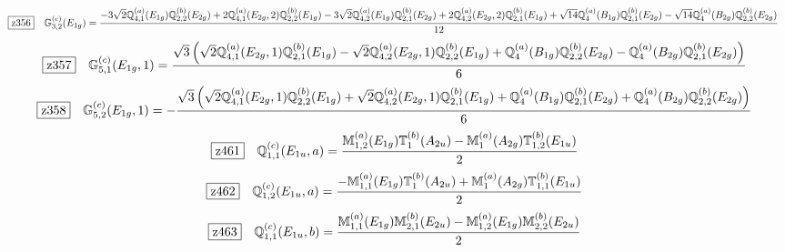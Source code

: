 \documentclass[fleqn,10pt,landscape]{jsarticle}
\begin{document}
\begin{dmath*}
\hspace*{3mm}\fbox{z356}\quad \mathbb{G}_{3,2}^{(c)}(E_{1g})=\frac{- 3 \sqrt{2} \mathbb{Q}_{4,1}^{(a)}(E_{1g}) \mathbb{Q}_{2,2}^{(b)}(E_{2g}) + 2 \mathbb{Q}_{4,1}^{(a)}(E_{2g},2) \mathbb{Q}_{2,2}^{(b)}(E_{1g}) - 3 \sqrt{2} \mathbb{Q}_{4,2}^{(a)}(E_{1g}) \mathbb{Q}_{2,1}^{(b)}(E_{2g}) + 2 \mathbb{Q}_{4,2}^{(a)}(E_{2g},2) \mathbb{Q}_{2,1}^{(b)}(E_{1g}) + \sqrt{14} \mathbb{Q}_{4}^{(a)}(B_{1g}) \mathbb{Q}_{2,1}^{(b)}(E_{2g}) - \sqrt{14} \mathbb{Q}_{4}^{(a)}(B_{2g}) \mathbb{Q}_{2,2}^{(b)}(E_{2g})}{12}
\end{dmath*}
\begin{dmath*}
\hspace*{3mm}\fbox{z357}\quad \mathbb{G}_{5,1}^{(c)}(E_{1g},1)=\frac{\sqrt{3} \left(\sqrt{2} \mathbb{Q}_{4,1}^{(a)}(E_{2g},1) \mathbb{Q}_{2,1}^{(b)}(E_{1g}) - \sqrt{2} \mathbb{Q}_{4,2}^{(a)}(E_{2g},1) \mathbb{Q}_{2,2}^{(b)}(E_{1g}) + \mathbb{Q}_{4}^{(a)}(B_{1g}) \mathbb{Q}_{2,2}^{(b)}(E_{2g}) - \mathbb{Q}_{4}^{(a)}(B_{2g}) \mathbb{Q}_{2,1}^{(b)}(E_{2g})\right)}{6}
\end{dmath*}
\begin{dmath*}
\hspace*{3mm}\fbox{z358}\quad \mathbb{G}_{5,2}^{(c)}(E_{1g},1)=- \frac{\sqrt{3} \left(\sqrt{2} \mathbb{Q}_{4,1}^{(a)}(E_{2g},1) \mathbb{Q}_{2,2}^{(b)}(E_{1g}) + \sqrt{2} \mathbb{Q}_{4,2}^{(a)}(E_{2g},1) \mathbb{Q}_{2,1}^{(b)}(E_{1g}) + \mathbb{Q}_{4}^{(a)}(B_{1g}) \mathbb{Q}_{2,1}^{(b)}(E_{2g}) + \mathbb{Q}_{4}^{(a)}(B_{2g}) \mathbb{Q}_{2,2}^{(b)}(E_{2g})\right)}{6}
\end{dmath*}
\begin{dmath*}
\hspace*{3mm}\fbox{z461}\quad \mathbb{Q}_{1,1}^{(c)}(E_{1u},a)=\frac{\mathbb{M}_{1,2}^{(a)}(E_{1g}) \mathbb{T}_{1}^{(b)}(A_{2u}) - \mathbb{M}_{1}^{(a)}(A_{2g}) \mathbb{T}_{1,2}^{(b)}(E_{1u})}{2}
\end{dmath*}
\begin{dmath*}
\hspace*{3mm}\fbox{z462}\quad \mathbb{Q}_{1,2}^{(c)}(E_{1u},a)=\frac{- \mathbb{M}_{1,1}^{(a)}(E_{1g}) \mathbb{T}_{1}^{(b)}(A_{2u}) + \mathbb{M}_{1}^{(a)}(A_{2g}) \mathbb{T}_{1,1}^{(b)}(E_{1u})}{2}
\end{dmath*}
\begin{dmath*}
\hspace*{3mm}\fbox{z463}\quad \mathbb{Q}_{1,1}^{(c)}(E_{1u},b)=\frac{\mathbb{M}_{1,1}^{(a)}(E_{1g}) \mathbb{M}_{2,1}^{(b)}(E_{2u}) - \mathbb{M}_{1,2}^{(a)}(E_{1g}) \mathbb{M}_{2,2}^{(b)}(E_{2u})}{2}
\end{dmath*}
\end{document}
